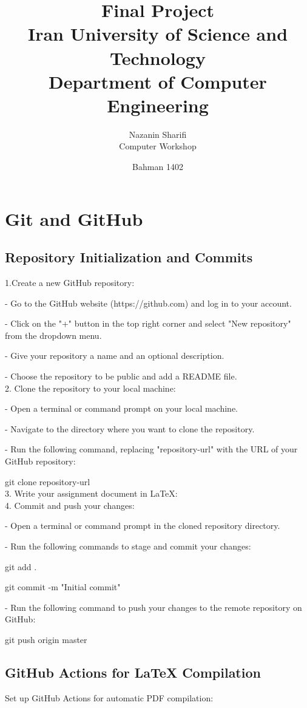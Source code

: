 \documentclass[12pt]{article}
\title{
	\vspace{2in}
	\textbf{Final Project}\\
	\vspace{.2 in}
	\large Iran University of Science and Technology\\
	\large Department of Computer Engineering\\
	\vspace{2in}
}
\author{
	\vspace{0.2in}
	Nazanin Sharifi\\
	Computer Workshop 
	\vspace{0.2in}
}
\date{ Bahman 1402}
\begin{document}
	\begin{titlepage}
	\maketitle
	\thispagestyle{empty}
\end{titlepage}
\newpage
\tableofcontents
\newpage
\section{Git and GitHub}
\subsection{Repository Initialization and Commits}
1.Create a new GitHub repository:

- Go to the GitHub website (https://github.com) and log in to your account.

- Click on the "+" button in the top right corner and select "New repository" from the dropdown menu.

- Give your repository a name and an optional description.

- Choose  the repository to be public and add a README file.\\
2. Clone the repository to your local machine:

- Open a terminal or command prompt on your local machine.

- Navigate to the directory where you want to clone the repository.

- Run the following command, replacing "repository-url" with the URL of your GitHub repository:

git clone repository-url\\
3. Write your assignment document in LaTeX:\\
4. Commit and push your changes:

- Open a terminal or command prompt in the cloned repository directory.

- Run the following commands to stage and commit your changes:

git add .

git commit -m "Initial commit"



- Run the following command to push your changes to the remote repository on GitHub:

git push origin master

\subsection{GitHub Actions for LaTeX Compilation}
Set up GitHub Actions for automatic PDF compilation:
\end{document}
